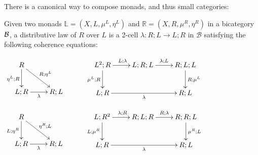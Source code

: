 There is a canonical way to compose monads, and thus small categories:
\begin{definition}
Given two monads $\mathbb{L}=(X,L,\mu^L, \eta^L)$ and $\mathbb{R}=(X,R,\mu^R, \eta^R)$ in a bicategory $\cal B$, a distributive law of $R$ over $L$ is a 2-cell $\lambda:R;L\to L;R$ in $\mathcal B$ satisfying the following coherence equations:

\hfil
$
\xymatrix{
R \ar[dr]^{R;\eta^L} \ar[d]_{\eta^L;R}\\
 L;R \ar[r]_{\lambda}
 & R;L
}
\hspace*{1cm}
\xymatrix{
L^2;R \ar[r]^{L;\lambda} \ar[d]_{\mu^L;R}
 & L;R;L \ar[r]^{\lambda;L}
  & R;L;L \ar[d]^{R;\mu^L}\\
L;R \ar[rr]_{\lambda}
  & 
  &R;L
}
$

\hfil
$
\xymatrix{
R \ar[dr]^{\eta^R;L} \ar[d]_{L;\eta^R}\\
 L;R \ar[r]_{\lambda}
 & R;L
}
\hspace*{1cm}
\xymatrix{
L;R^2 \ar[r]^{\lambda;R} \ar[d]_{L;\mu^R}
 & R;L;R \ar[r]^{R;\lambda}
  & R;R;L \ar[d]^{\mu^R;L}\\
L;R \ar[rr]_{\lambda}
  & 
  &R;L
}
$


\end{definition}
